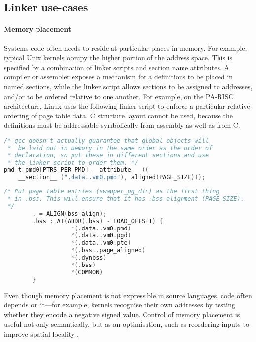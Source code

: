 \subsection{Linker use-cases}

\paragraph{Memory placement}
Systems code often needs to reside at particular places in memory.
For example, typical Unix kernels occupy the higher portion of the address space.
This is specified by a combination of linker scripts and section name attributes. 
A compiler or assembler exposes a mechanism for a definitions to be placed in named sections,
while the linker script allows sections to be assigned to addresses, 
and/or to be ordered relative to one another.
For example, on the PA-RISC architecture, Linux uses the following 
linker script to enforce a particular relative ordering of page table data.
C structure layout cannot be used, because the definitions must be addressable
symbolically from assembly as well as from C.

{\scriptsize\begin{lstlisting}[language=C,columns=flexible,basicstyle=\sffamily]
/* gcc doesn't actually guarantee that global objects will
 *  be laid out in memory in the same order as the order of 
 * declaration, so put these in different sections and use
 * the linker script to order them. */
pmd_t pmd0[PTRS_PER_PMD] __attribute__ ((
    __section__ (".data..vm0.pmd"), aligned(PAGE_SIZE)));
\end{lstlisting}}

{\scriptsize\begin{lstlisting}[language=C,columns=flexible,basicstyle=\sffamily]
/* Put page table entries (swapper_pg_dir) as the first thing 
 * in .bss. This will ensure that it has .bss alignment (PAGE_SIZE).
 */
        . = ALIGN(bss_align);                
        .bss : AT(ADDR(.bss) - LOAD_OFFSET) {
                   *(.data..vm0.pmd)
                   *(.data..vm0.pgd)
                   *(.data..vm0.pte)
                   *(.bss..page_aligned)     
                   *(.dynbss)                
                   *(.bss)                   
                   *(COMMON)                 
        }
\end{lstlisting}}

Even though memory placement is not expressible in source languages, 
code often depends on it---for example, kernels recognise their own addresses
by testing whether they encode a negative signed value.
Control of memory placement is useful not only semantically, 
but as an optimisation, such as 
reordering inputs to improve spatial locality \citep{orr_dynamic_1994}.

